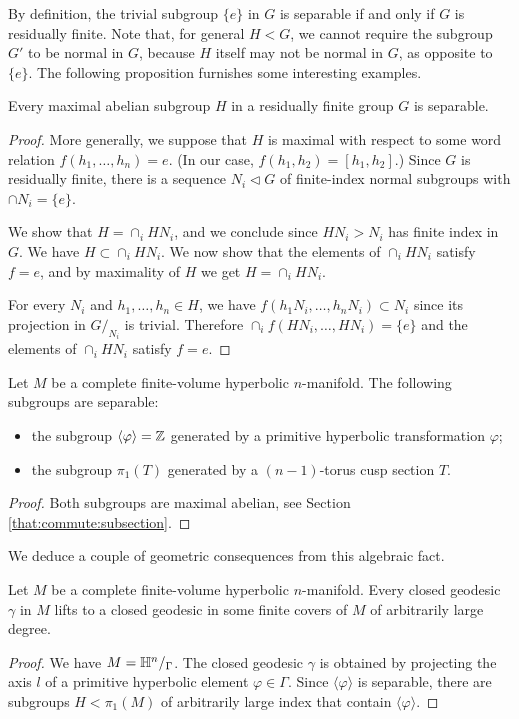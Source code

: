 By definition, the trivial subgroup $\{e\}$ in $G$ is separable if and only if $G$ is residually finite. Note that, for general $H<G$, we cannot require the subgroup $G'$ to be normal in $G$, because $H$ itself may not be normal in $G$, as opposite to $\{e\}$.
The following proposition furnishes some interesting examples.

\begin{prop} \label{Long:prop}
Every maximal abelian subgroup $H$ in a residually finite group $G$ is separable.
\end{prop}
\begin{proof}
More generally, we suppose that $H$ is maximal with respect to some word relation $f(h_1,\ldots, h_n)=e$. (In our case, $f(h_1, h_2) = [h_1, h_2]$.) Since $G$ is residually finite, there is a sequence $N_i \triangleleft G $ of finite-index normal subgroups with $\cap N_i = \{e\}$. 

We show that $H = \cap_i HN_i$, and we conclude since $HN_i > N_i$ has finite index in $G$. We have $H \subset \cap_i HN_i$. We now show that the elements of $\cap_i HN_i$ satisfy $f=e$, and by maximality of $H$ we get $H=\cap_i HN_i$.

For every $N_i$ and $h_1,\ldots, h_n \in H$, we have $f(h_1N_i, \ldots, h_nN_i) \subset  N_i$ since its projection in $G/_{N_i}$ is trivial. Therefore $\cap_i f(HN_i, \ldots, HN_i) = \{e\}$ and the elements of $\cap_i HN_i$ satisfy $f=e$.
\end{proof}

\begin{cor} \label{separable:cor}
Let $M$ be a complete finite-volume hyperbolic $n$-manifold. The following subgroups are separable:
\begin{itemize}
\item the subgroup $\langle \varphi \rangle = \mathbb{Z}$ generated by a primitive hyperbolic transformation $\varphi$;
\item the subgroup $\pi_1(T)$ generated by a $(n-1)$-torus cusp section $T$.
\end{itemize}
\end{cor}
\begin{proof}
Both subgroups are maximal abelian, see Section \ref{that:commute:subsection}.
\end{proof}

We deduce a couple of geometric consequences from this algebraic fact.

\begin{cor}
Let $M$ be a complete finite-volume hyperbolic $n$-manifold. Every closed geodesic $\gamma$ in $M$ lifts to a closed geodesic in some finite covers of $M$ of arbitrarily large degree.
\end{cor}
\begin{proof}
We have $M= \mathbb{H}^n/_\Gamma$. The closed geodesic $\gamma$ is obtained by projecting the axis $l$ of a primitive hyperbolic element $\varphi \in \Gamma$.
Since $\langle \varphi \rangle$ is separable, there are subgroups $H<\pi_1(M)$ of arbitrarily large index that contain $\langle \varphi \rangle$.
\end{proof}

